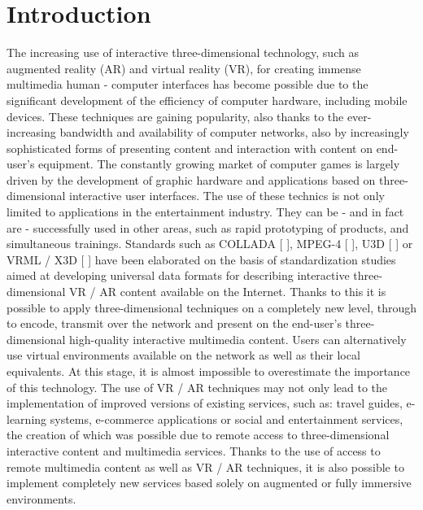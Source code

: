 \documentclass[runningheads]{llncs}
\begin{document}
\section{Introduction}
The increasing use of interactive three-dimensional technology, such as augmented reality (AR) and virtual reality (VR), for creating immense multimedia human - computer interfaces has become possible due to the significant development of the efficiency of computer hardware, including mobile devices. These techniques are gaining popularity, also thanks to the ever-increasing bandwidth and availability of computer networks, also by increasingly sophisticated forms of presenting content and interaction with content on end-user's equipment.
The constantly growing market of computer games is largely driven by the development of graphic hardware and applications based on three-dimensional interactive user interfaces. The use of these technics is not only limited to applications in the entertainment industry. They can be - and in fact are - successfully used in other areas, such as rapid prototyping of products, and simultaneous trainings. Standards such as COLLADA [ ], MPEG-4 [ ], U3D [ ] or VRML / X3D [ ] have been elaborated on the basis of standardization studies aimed at developing universal data formats for describing interactive three-dimensional VR / AR content available on the Internet.
Thanks to this it is possible to apply three-dimensional techniques on a completely new level, through to encode, transmit over the network and present on the end-user's three-dimensional high-quality interactive multimedia content. Users can alternatively use virtual environments available on the network as well as their local equivalents. At this stage, it is almost impossible to overestimate the importance of this technology.
The use of VR / AR techniques may not only lead to the implementation of improved versions of existing services, such as: travel guides, e-learning systems, e-commerce applications or social and entertainment services, the creation of which was possible due to remote access to three-dimensional interactive content and multimedia services. Thanks to the use of access to remote multimedia content as well as VR / AR techniques, it is also possible to implement completely new services based solely on augmented or fully immersive environments.
\end{document}
